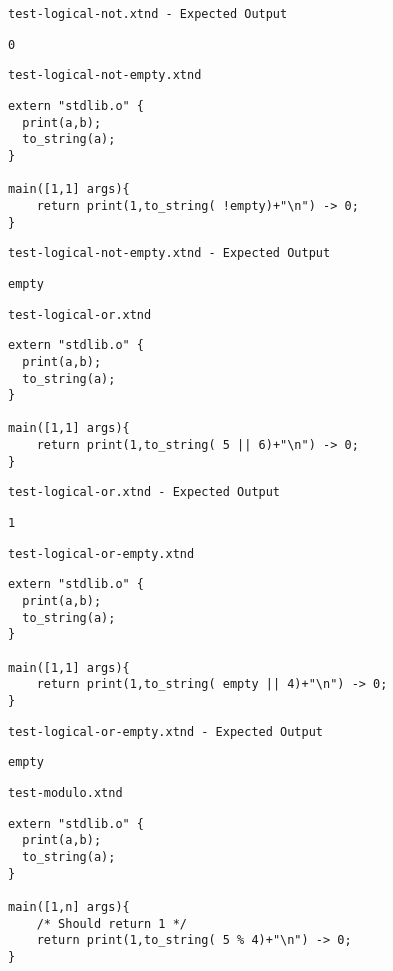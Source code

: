 \medskip \noindent \texttt{test-logical-not.xtnd - Expected Output}


\begin{lstlisting}
0
\end{lstlisting}


\medskip \noindent \texttt{test-logical-not-empty.xtnd}


\begin{lstlisting}
extern "stdlib.o" {
  print(a,b);
  to_string(a);
}

main([1,1] args){
	return print(1,to_string( !empty)+"\n") -> 0;
}
\end{lstlisting}


\medskip \noindent \texttt{test-logical-not-empty.xtnd - Expected Output}


\begin{lstlisting}
empty
\end{lstlisting}


\medskip \noindent \texttt{test-logical-or.xtnd}


\begin{lstlisting}
extern "stdlib.o" {
  print(a,b);
  to_string(a);
}

main([1,1] args){
	return print(1,to_string( 5 || 6)+"\n") -> 0;
}
\end{lstlisting}


\medskip \noindent \texttt{test-logical-or.xtnd - Expected Output}


\begin{lstlisting}
1
\end{lstlisting}


\medskip \noindent \texttt{test-logical-or-empty.xtnd}


\begin{lstlisting}
extern "stdlib.o" {
  print(a,b);
  to_string(a);
}

main([1,1] args){
	return print(1,to_string( empty || 4)+"\n") -> 0;
}
\end{lstlisting}


\medskip \noindent \texttt{test-logical-or-empty.xtnd - Expected Output}


\begin{lstlisting}
empty
\end{lstlisting}


\medskip \noindent \texttt{test-modulo.xtnd}


\begin{lstlisting}
extern "stdlib.o" {
  print(a,b);
  to_string(a);
}

main([1,n] args){
	/* Should return 1 */
	return print(1,to_string( 5 % 4)+"\n") -> 0;
}
\end{lstlisting}


